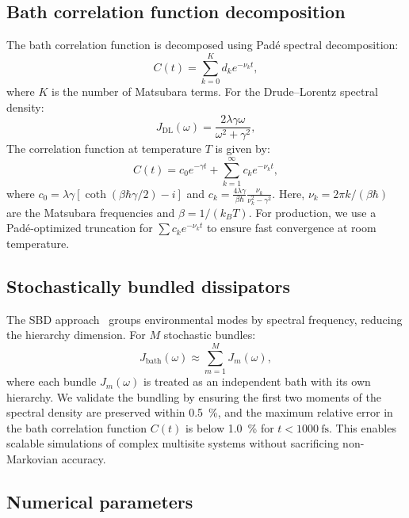 \documentclass[11pt,a4paper]{article}
\begin{document}
\subsection{Bath correlation function decomposition}

The bath correlation function is decomposed using Padé spectral decomposition:
\begin{equation}
C(t) = \sum_{k=0}^{K} d_k e^{-\nu_k t},
\label{eq:SI_bath_correlation}
\end{equation}
where $K$ is the number of Matsubara terms. For the Drude--Lorentz spectral density:
\begin{equation}
J_{\mathrm{DL}}(\omega) = \frac{2\lambda\gamma\omega}{\omega^2 + \gamma^2},
\label{eq:SI_drude_lorentz}
\end{equation}
The correlation function at temperature $T$ is given by:
\begin{equation}
C(t) = c_0 e^{-\gamma t} + \sum_{k=1}^{\infty} c_k e^{-\nu_k t},
\label{eq:SI_correlation_DL}
\end{equation}
where $c_0 = \lambda\gamma[\coth(\beta\hbar\gamma/2) - i]$ and $c_k = \frac{4\lambda\gamma}{\beta\hbar} \frac{\nu_k}{\nu_k^2 - \gamma^2}$. Here, $\nu_k = 2\pi k/(\beta\hbar)$ are the Matsubara frequencies and $\beta = 1/(k_B T)$. For production, we use a Padé-optimized truncation for $\sum c_k e^{-\nu_k t}$ to ensure fast convergence at room temperature.

\subsection{Stochastically bundled dissipators}

The SBD approach~\cite{Varvelo2021} groups environmental modes by spectral frequency, reducing the hierarchy dimension. For $M$ stochastic bundles:
\begin{equation}
J_{\mathrm{bath}}(\omega) \approx \sum_{m=1}^{M} J_m(\omega),
\label{eq:SI_sbd}
\end{equation}
where each bundle $J_m(\omega)$ is treated as an independent bath with its own hierarchy. We validate the bundling by ensuring the first two moments of the spectral density are preserved within \SI{0.5}{\percent}, and the maximum relative error in the bath correlation function $C(t)$ is below \SI{1.0}{\percent} for $t < \SI{1000}{\femto\second}$. This enables scalable simulations of complex multisite systems without sacrificing non-Markovian accuracy.

\subsection{Numerical parameters}
\end{document}
